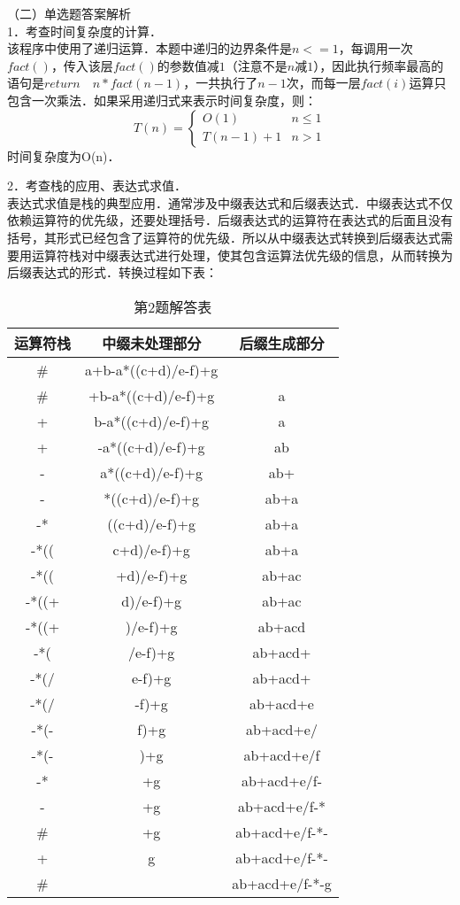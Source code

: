 （二）单选题答案解析\\
1．考查时间复杂度的计算．\\
该程序中使用了递归运算．本题中递归的边界条件是$n<=1$，每调用一次$fact()$，传入该层$fact()$的参数值减$1$（注意不是$n$减$1$），因此执行频率最高的语句是$return \quad n*fact(n-1)$，一共执行了$n-1$次，而每一层$fact(i)$运算只包含一次乘法．如果采用递归式来表示时间复杂度，则： \\
\begin{equation}
T(n)= 
\begin{cases}
O(1) & n \le 1\\
T(n-1)+1 & n>1
\end{cases}
\end{equation}
时间复杂度为O(n)．

2．考查栈的应用、表达式求值．\\
表达式求值是栈的典型应用．通常涉及中缀表达式和后缀表达式．中缀表达式不仅依赖运算符的优先级，还要处理括号．后缀表达式的运算符在表达式的后面且没有括号，其形式已经包含了运算符的优先级．所以从中缀表达式转换到后缀表达式需要用运算符栈对中缀表达式进行处理，使其包含运算法优先级的信息，从而转换为后缀表达式的形式．转换过程如下表： \\
\begin{table}[ht]
\centering
\caption{第2题解答表}\label{CSN12_tab4}
\begin{tabular}{|c|c|c|}
\hline
运算符栈 & 中缀未处理部分 & 后缀生成部分 \\
\hline
# &a+b-a*((c+d)/e-f)+g & \\
\hline
# &+b-a*((c+d)/e-f)+g &a \\
\hline
+ &b-a*((c+d)/e-f)+g &a \\
\hline
+ &-a*((c+d)/e-f)+g &ab \\
\hline
- &a*((c+d)/e-f)+g &ab+ \\
\hline
- &*((c+d)/e-f)+g &ab+a \\
\hline
-* &((c+d)/e-f)+g &ab+a \\
\hline
-*(( &c+d)/e-f)+g &ab+a \\
\hline
-*(( &+d)/e-f)+g &ab+ac \\
\hline
-*((+ &d)/e-f)+g &ab+ac \\
\hline
-*((+ &)/e-f)+g &ab+acd \\
\hline
-*( &/e-f)+g &ab+acd+ \\
\hline
-*(/ &e-f)+g &ab+acd+ \\
\hline
-*(/ &-f)+g &ab+acd+e \\
\hline
-*(- &f)+g &ab+acd+e/ \\
\hline
-*(- &)+g &ab+acd+e/f \\
\hline
-* &+g &ab+acd+e/f- \\
\hline
- &+g &ab+acd+e/f-* \\
\hline
# &+g &ab+acd+e/f-*- \\
\hline
+ &g &ab+acd+e/f-*- \\
\hline
# &&ab+acd+e/f-*-g \\
\hline
\end{tabular}
\end{table}

